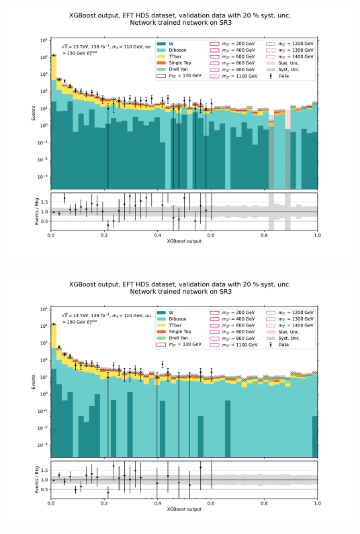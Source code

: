 \documentclass[12pt, a4paper]{book}
\begin{document}
\begin{figure}[!ht]
	\centering
	\begin{subfigure}[b]{0.49\textwidth}
      \centering
      \includegraphics[width=1\textwidth]{XGBoost/Model_independent/150/EFT_HDS/VAL_ee.pdf}
   \end{subfigure}
   \hfill
   \begin{subfigure}[b]{0.49\textwidth}
      \centering
      \includegraphics[width=1\textwidth]{XGBoost/Model_independent/150/EFT_HDS/VAL_uu.pdf}
   \end{subfigure}
   \hfill
   \begin{subfigure}[b]{0.49\textwidth}
      \centering

\end{subfigure}
\end{figure}
\end{document}
